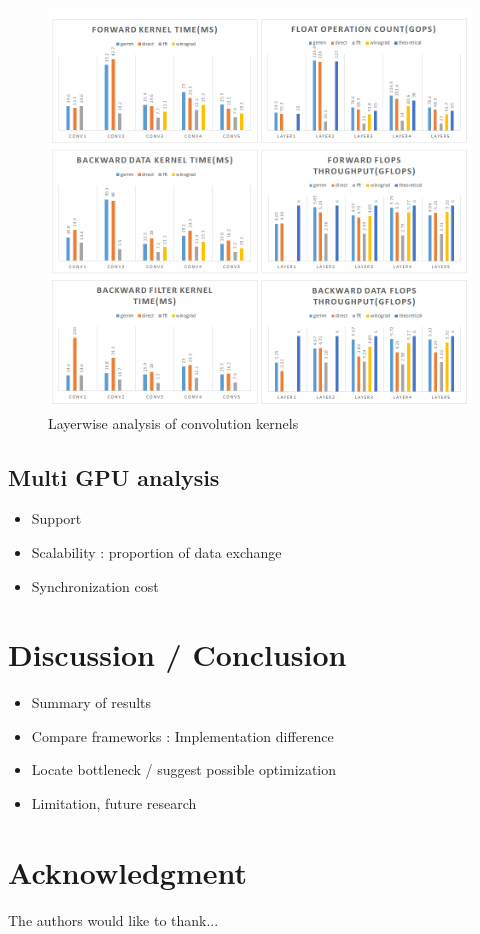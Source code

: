 \documentclass[conference]{IEEEtran}
\begin{document}
\begin{figure}
  \centering
  \includegraphics[width=\linewidth]{./figures/layerwise_bench}
  \caption{Layerwise analysis of convolution kernels}
  \label{fig_layerwise}
\end{figure}


\subsection{Multi GPU analysis}

\begin{itemize}
  \item Support
  \item Scalability : proportion of data exchange
  \item Synchronization cost
\end{itemize}

\section{Discussion / Conclusion}

\begin{itemize}
  \item Summary of results
  \item Compare frameworks : Implementation difference
  \item Locate bottleneck / suggest possible optimization
  \item Limitation, future research
\end{itemize}

\section*{Acknowledgment}

The authors would like to thank...

\end{document}
